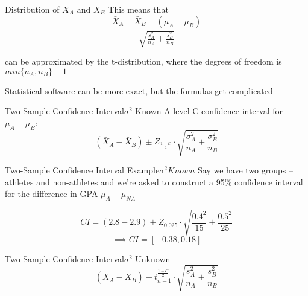 \documentclass{beamer}
\begin{document}
\begin{frame}{Distribution of $\bar{X}_A$ and $\bar{X}_B$}
	This means that 
	\[
		\frac{\bar{X}_A-\bar{X}_B - (\mu_A-\mu_B)}{\sqrt{\frac{s^2_A}{n_A} + \frac{s^2_B}{n_B}}}
	\]
	
	can be approximated by the t-distribution, where the degrees of freedom is $min\{n_A, n_B\}-1$
	
	Statistical software can be more exact, but the formulas get complicated 
\end{frame}

\begin{frame}{Two-Sample Confidence Interval}{$\sigma^2$ Known}
	A level C confidence interval for $\mu_A-\mu_B$:
	\[ 
		(\bar{X}_A-\bar{X}_B) \pm Z_{\frac{1-C}{2}} \cdot \sqrt{\frac{\sigma^2_A}{n_A}+\frac{\sigma^2_B}{n_B}}
	\]
\end{frame}

\begin{frame}{Two-Sample Confidence Interval Example}{$\sigma^2 Known$}
	Say we have two groups -- athletes and non-athletes and we're asked to construct a 95\% confidence interval for the difference in GPA $\mu_A-\mu_{NA}$

	
	\begin{center}
	\end{center}

	\[ 
		CI= (2.8-2.9) \pm Z_{0.025}\cdot \sqrt{\frac{0.4^2}{15}+\frac{0.5^2}{25}}
	\]
	\[ 
		\implies CI= [-0.38, 0.18]
	\]
\end{frame}

\begin{frame}{Two-Sample Confidence Interval}{$\sigma^2$ Unknown}
	\[ 
		(\bar{X}_A-\bar{X}_B) \pm t_{n-1}^{\frac{1-C}{2}} \cdot \sqrt{\frac{s^2_A}{n_A}+\frac{s^2_B}{n_B}}
	\]
\end{frame}
\end{document}

